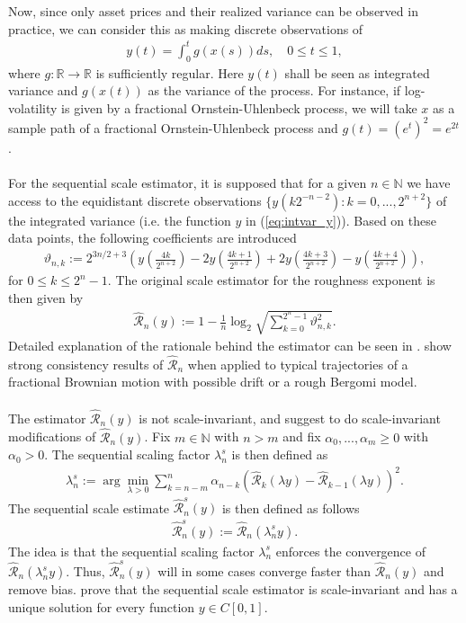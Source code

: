 \documentclass{article}
\begin{document}
Now, since only asset prices and their realized variance can be observed in practice, we can consider this as making discrete observations of
\begin{align}
y(t) = \int_0^t g\left(x(s)\right) ds, \quad 0\leq t \leq 1, \label{eq:intvar_y}
\end{align}
where $g: \mathbb{R}\rightarrow \mathbb{R}$ is sufficiently regular. Here $y(t)$ shall be seen as integrated variance and $g\left(x(t)\right)$ as the variance of the process. For instance, if log-volatility is given by a fractional Ornstein-Uhlenbeck process, we will take $x$  as a sample path of a fractional Ornstein-Uhlenbeck process and $g(t)=(e^t)^2 = e^{2t}$.\\\\
For the sequential scale estimator, it is supposed that for a given $n\in \mathbb{N}$ we have access to the equidistant discrete observations $\{y(k2^{-n-2}):k=0,...,2^{n+2}\}$ of the integrated variance (i.e. the function $y$ in (\ref{eq:intvar_y})). Based on these data points, the following coefficients are introduced
\begin{align*}
\vartheta_{n,k} := 2^{3n/2+3} \left( 
y\left( \frac{4k}{2^{n+2}} \right) 
- 2y\left( \frac{4k+1}{2^{n+2}} \right) 
+ 2y\left( \frac{4k+3}{2^{n+2}} \right) 
- y\left( \frac{4k+4}{2^{n+2}} \right) 
\right),
\end{align*}
for $0\leq k \leq 2^n - 1$. The original scale estimator for the roughness exponent is then given by
\begin{align*}
\hat{\mathscr{R}}_n (y) := 1 - \frac{1}{n}\log_2 \sqrt{\sum_{k=0}^{2^n-1}\vartheta_{n,k}^2}.
\end{align*}
Detailed explanation of the rationale behind the estimator can be seen in \cite{han2022robust}. \cite{han} show strong consistency results of $\hat{\mathscr{R}}_n$ when applied to typical trajectories of a fractional Brownian motion with possible drift or a rough Bergomi model.\\\\
The estimator $\hat{\mathscr{R}}_n (y)$ is not scale-invariant, and \cite{han} suggest to do scale-invariant modifications of $\hat{\mathscr{R}}_n (y)$. Fix $m\in \mathbb{N}$ with $n>m$ and fix $\alpha_0, ..., \alpha_m \geq 0$ with $\alpha_0>0$. The sequential scaling factor $\lambda_n^s$ is then defined as
\begin{align}
\lambda_n^s := \arg\min_{\lambda>0} \sum_{k=n-m}^n \alpha_{n-k} \left( \hat{\mathscr{R}}_k (\lambda y)-\hat{\mathscr{R}}_{k-1} (\lambda y)\right)^2 . \label{eq:scale_lambda}
\end{align}
The sequential scale estimate $\hat{\mathscr{R}}_n^s (y)$ is then defined as follows 
\begin{align*}
\hat{\mathscr{R}}_n^s (y) := \hat{\mathscr{R}}_n (\lambda_n^s y).
\end{align*}
The idea is that the sequential scaling factor $\lambda_n^s$ enforces the convergence of $\hat{\mathscr{R}}_n (\lambda_n^s y)$. Thus, $\hat{\mathscr{R}}_n^s (y)$ will in some cases converge faster than $\hat{\mathscr{R}}_n (y)$ and remove bias. \cite{han} prove that the sequential scale estimator is scale-invariant and has a unique solution for every function $y\in C[0,1]$.
\end{document}
